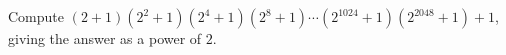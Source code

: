 Compute $(2+1)\left(2^2+1\right)\left(2^4+1\right)\left(2^8+1\right)\cdots\left(2^{1024}+1\right)\left(2^{2048}+1\right)+1$, giving the answer as a power of $2$.
